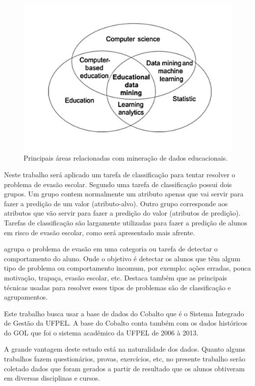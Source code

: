 \documentclass[diss-proposta,nocipinfo]{texufpel}
\begin{document}
\begin{figure}[htbp]
  \centering \includegraphics[scale=.4]{imagens/areas-edm.pdf}
  \caption{Principais áreas relacionadas com mineração de dados educacionais. \cite{Koedinger2008}}
  \label{fig:areas-relacionadas-mde}
\end{figure}


Neste trabalho será aplicado um tarefa de classificação para tentar resolver o problema de evasão escolar. 
Segundo \citet{goldschmidt2015data} uma tarefa de classificação possui dois grupos. Um grupo contem normalmente um atributo apenas que vai servir para fazer a predição de um valor (atributo-alvo). Outro grupo corresponde aos atributos que vão servir para fazer a predição do valor (atributos de predição).
Tarefas de classificação são largamente utilizadas para fazer a predição de alunos em risco de evasão escolar, como será apresentado mais afrente.

\citet{baker2010data} agrupa o problema de evasão em uma categoria ou tarefa de detectar o comportamento do aluno.
Onde o objetivo é detectar os alunos que têm algum tipo de problema ou comportamento incomum, por exemplo: ações erradas, pouca motivação, trapaça, evasão escolar, etc.
Destaca também que as principais técnicas usadas para resolver esses tipos de problemas são de classificação e agrupamentos.

Este trabalho busca usar a base de dados do Cobalto que é o Sistema Integrado de Gestão da UFPEL. A base do Cobalto conta também com os dados históricos do GOL que foi o sistema acadêmico da UFPEL de 2006 à 2013. %

A grande vantagem deste estudo está na naturalidade dos dados. Quanto alguns trabalhos fazem questionários, provas, exercícios, etc, no presente trabalho serão coletado dados que foram gerados a partir de resultado que os alunos obtiveram em diversas disciplinas e cursos.
\end{document}
